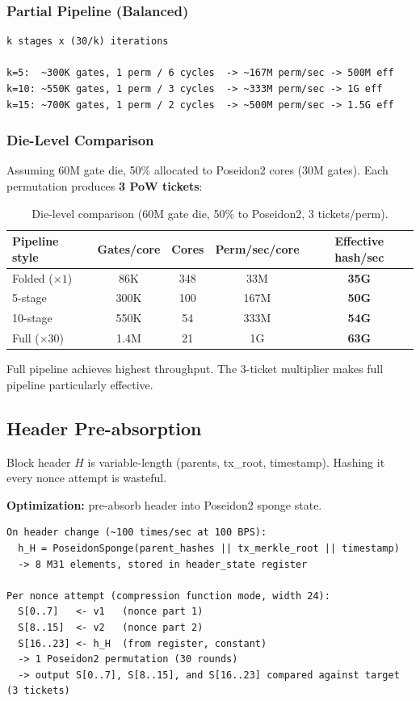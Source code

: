 \documentclass[11pt,a4paper]{article}
\begin{document}
\subsubsection{Partial Pipeline (Balanced)}
\begin{Verbatim}[fontsize=\small]
k stages x (30/k) iterations

k=5:  ~300K gates, 1 perm / 6 cycles  -> ~167M perm/sec -> 500M eff
k=10: ~550K gates, 1 perm / 3 cycles  -> ~333M perm/sec -> 1G eff
k=15: ~700K gates, 1 perm / 2 cycles  -> ~500M perm/sec -> 1.5G eff
\end{Verbatim}

\subsubsection{Die-Level Comparison}

Assuming 60M gate die, 50\% allocated to Poseidon2 cores (30M gates). Each permutation produces \textbf{3 PoW tickets}:

\begin{table}[h]
\centering
\begin{tabular}{@{}lcccc@{}}
\toprule
Pipeline style & Gates/core & Cores & Perm/sec/core & Effective hash/sec \\
\midrule
Folded ($\times 1$) & 86K & 348 & 33M & \textbf{35G} \\
5-stage & 300K & 100 & 167M & \textbf{50G} \\
10-stage & 550K & 54 & 333M & \textbf{54G} \\
Full ($\times 30$) & 1.4M & 21 & 1G & \textbf{63G} \\
\bottomrule
\end{tabular}
\caption{Die-level comparison (60M gate die, 50\% to Poseidon2, 3 tickets/perm).}
\label{tab:pipeline}
\end{table}

Full pipeline achieves highest throughput. The 3-ticket multiplier makes full pipeline particularly effective.

\subsection{Header Pre-absorption}

Block header $H$ is variable-length (parents, tx\_root, timestamp). Hashing it every nonce attempt is wasteful.

\textbf{Optimization:} pre-absorb header into Poseidon2 sponge state.
\begin{Verbatim}[fontsize=\small]
On header change (~100 times/sec at 100 BPS):
  h_H = PoseidonSponge(parent_hashes || tx_merkle_root || timestamp)
  -> 8 M31 elements, stored in header_state register

Per nonce attempt (compression function mode, width 24):
  S[0..7]   <- v1   (nonce part 1)
  S[8..15]  <- v2   (nonce part 2)
  S[16..23] <- h_H  (from register, constant)
  -> 1 Poseidon2 permutation (30 rounds)
  -> output S[0..7], S[8..15], and S[16..23] compared against target (3 tickets)
\end{Verbatim}
\end{document}
